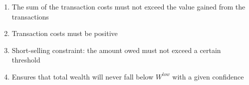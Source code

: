\documentclass[a4paper, 12pt]{article}
\begin{document}
	\begin{enumerate}
		\item The sum of the transaction costs must not exceed the value gained from the transactions
		\item Transaction costs must be positive
		\item Short-selling constraint: the amount owed must not exceed a certain threshold
		\item Ensures that total wealth will never fall below $W^{low}$ with a given confidence
	\end{enumerate}
\end{document}
